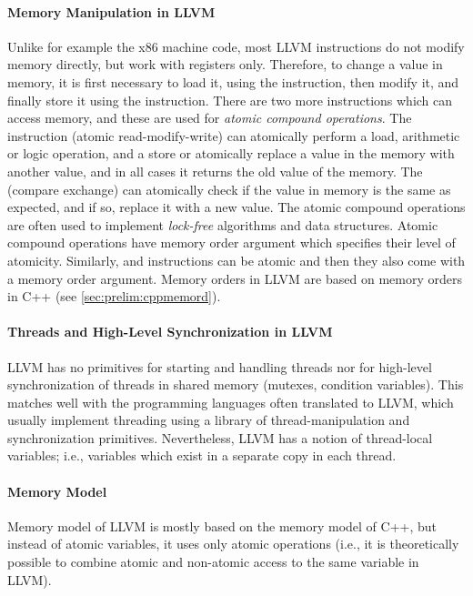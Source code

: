 \paragraph{Memory Manipulation in LLVM}
Unlike for example the x86 machine code, most LLVM instructions do not modify
memory directly, but work with registers only.
Therefore, to change a value in memory, it is first necessary to load it, using
the  instruction, then modify it, and finally store it using the
 instruction.
There are two more instructions which can access memory, and these are used for
\emph{atomic compound operations}.
The  instruction (atomic read-modify-write) can atomically
perform a load, arithmetic or logic operation, and a store or atomically
replace a value in the memory with another value, and in all cases it returns
the old value of the memory.
The  (compare exchange) can atomically check if the value in memory
is the same as expected, and if so, replace it with a new value.
The atomic compound operations are often used to implement \emph{lock-free}
algorithms and data structures.
Atomic compound operations have memory order argument which specifies their
level of atomicity.
Similarly,  and  instructions can be atomic and then they
also come with a memory order argument.
Memory orders in LLVM are based on memory orders in C++ (see
\autoref{sec:prelim:cppmemord}).

\paragraph{Threads and High-Level Synchronization in LLVM}

LLVM has no primitives for starting and handling threads nor for high-level synchronization of threads in shared memory (mutexes, condition variables).
This matches well with the programming languages often translated to LLVM,
which usually implement threading using a library of thread-manipulation and
synchronization primitives.
Nevertheless, LLVM has a notion of thread-local variables; i.e., variables
which exist in a separate copy in each thread.

\paragraph{Memory Model}

Memory model of LLVM is mostly based on the memory model of C++, but instead of
atomic variables, it uses only atomic operations (i.e., it is theoretically
possible to combine atomic and non-atomic access to the same variable in LLVM).

